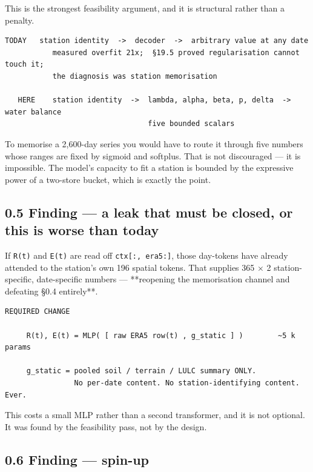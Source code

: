 \documentclass[10pt,a4paper]{article}
\begin{document}
This is the strongest feasibility argument, and it is structural rather than a
penalty.

\begin{Verbatim}[fontsize=\scriptsize,frame=leftline,framerule=0.6pt,rulecolor=\color{rulegray},xleftmargin=6pt,framesep=6pt,]
   TODAY   station identity  ->  decoder  ->  arbitrary value at any date
           measured overfit 21x;  §19.5 proved regularisation cannot touch it;
           the diagnosis was station memorisation

   HERE    station identity  ->  lambda, alpha, beta, p, delta  ->  water balance
                                 five bounded scalars
\end{Verbatim}

To memorise a 2,600-day series you would have to route it through five numbers
whose ranges are fixed by sigmoid and softplus. That is not discouraged — it is
impossible. The model's capacity to fit a station is bounded by the expressive
power of a two-store bucket, which is exactly the point.

\subsection*{0.5 Finding — a leak that must be closed, or this is worse than today}

If \texttt{R(t)} and \texttt{E(t)} are read off \texttt{ctx[:, era5:]}, those day-tokens have already
attended to the station's own 196 spatial tokens. That supplies 365 × 2
station-specific, date-specific numbers — **reopening the memorisation channel
and defeating §0.4 entirely**.

\begin{Verbatim}[fontsize=\scriptsize,frame=leftline,framerule=0.6pt,rulecolor=\color{rulegray},xleftmargin=6pt,framesep=6pt,]
   REQUIRED CHANGE

     R(t), E(t) = MLP( [ raw ERA5 row(t) , g_static ] )        ~5 k params

     g_static = pooled soil / terrain / LULC summary ONLY.
                No per-date content. No station-identifying content. Ever.
\end{Verbatim}

This costs a small MLP rather than a second transformer, and it is not optional.
It was found by the feasibility pass, not by the design.

\subsection*{0.6 Finding — spin-up}
\end{document}
